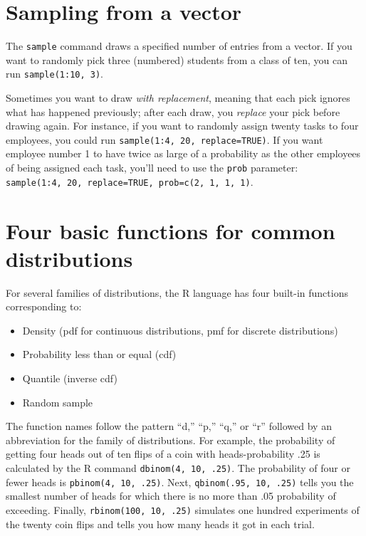 \documentclass[]{book}
\providecommand{\tightlist}{%
  \setlength{\itemsep}{0pt}\setlength{\parskip}{0pt}}
\theoremstyle{definition}
\theoremstyle{definition}
\theoremstyle{definition}
\theoremstyle{remark}
\begin{document}
\hypertarget{sampling-from-a-vector}{%
\section{Sampling from a vector}\label{sampling-from-a-vector}}

The \texttt{sample} command draws a specified number of entries from a
vector. If you want to randomly pick three (numbered) students from a
class of ten, you can run \texttt{sample(1:10,\ 3)}.

Sometimes you want to draw \emph{with replacement}, meaning that each
pick ignores what has happened previously; after each draw, you
\emph{replace} your pick before drawing again. For instance, if you want
to randomly assign twenty tasks to four employees, you could run
\texttt{sample(1:4,\ 20,\ replace=TRUE)}. If you want employee number 1
to have twice as large of a probability as the other employees of being
assigned each task, you'll need to use the \texttt{prob} parameter:
\texttt{sample(1:4,\ 20,\ replace=TRUE,\ prob=c(2,\ 1,\ 1,\ 1)}.

\hypertarget{four-basic-functions-for-common-distributions}{%
\section{Four basic functions for common
distributions}\label{four-basic-functions-for-common-distributions}}

For several families of distributions, the R language has four built-in
functions corresponding to:

\begin{itemize}
\tightlist
\item
  Density (pdf for continuous distributions, pmf for discrete
  distributions)
\item
  Probability less than or equal (cdf)
\item
  Quantile (inverse cdf)
\item
  Random sample
\end{itemize}

The function names follow the pattern ``d,'' ``p,'' ``q,'' or ``r''
followed by an abbreviation for the family of distributions. For
example, the probability of getting four heads out of ten flips of a
coin with heads-probability .25 is calculated by the R command
\texttt{dbinom(4,\ 10,\ .25)}. The probability of four or fewer heads is
\texttt{pbinom(4,\ 10,\ .25)}. Next, \texttt{qbinom(.95,\ 10,\ .25)}
tells you the smallest number of heads for which there is no more than
.05 probability of exceeding. Finally, \texttt{rbinom(100,\ 10,\ .25)}
simulates one hundred experiments of the twenty coin flips and tells you
how many heads it got in each trial.
\end{document}

